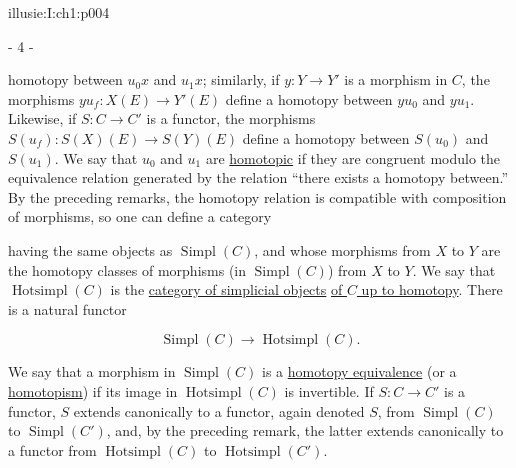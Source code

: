 \IllusieSetPhysicalPageSize{447bp}{698.6bp}
\begin{illusiebodypage}{illusie:I:ch1:p004}
\begin{center}- 4 -\end{center}
\vspace{7bp}\fontsize{9}{18}\selectfont

\hypertarget{illusie:I:ch1:s1:1:p9c1}{}%
\noindent homotopy between $u_0x$ and $u_1x$; similarly, if
$y:Y\longrightarrow Y'$ is a morphism in $C$, the morphisms
$yu_f:X(E)\longrightarrow Y'(E)$ define a homotopy between $yu_0$ and $yu_1$.
Likewise, if $S:C\longrightarrow C'$ is a functor, the morphisms
$S(u_f):S(X)(E)\longrightarrow S(Y)(E)$ define a homotopy between $S(u_0)$ and
$S(u_1)$. We say that $u_0$ and $u_1$ are \underline{homotopic} if they are
congruent modulo the equivalence relation generated by the relation “there
exists a homotopy between.” By the preceding remarks, the homotopy relation is
compatible with composition of morphisms, so one can define a category

\hypertarget{illusie:I:ch1:s1:1:eq5}{}%
\noindent{}\par

\hypertarget{illusie:I:ch1:s1:1:p10}{}%
having the same objects as $\operatorname{Simpl}(C)$, and whose morphisms from
$X$ to $Y$ are the homotopy classes of morphisms (in
$\operatorname{Simpl}(C)$) from $X$ to $Y$. We say that
$\operatorname{Hotsimpl}(C)$ is the \underline{category of simplicial objects}
\underline{of $C$ up to homotopy}. There is a natural functor

\hypertarget{illusie:I:ch1:s1:1:d7}{}%
\[
  \operatorname{Simpl}(C)\longrightarrow\operatorname{Hotsimpl}(C).
\]

\hypertarget{illusie:I:ch1:s1:1:p11}{}%
We say that a morphism in $\operatorname{Simpl}(C)$ is a
\underline{homotopy equivalence} (or a \underline{homotopism}) if its image in
$\operatorname{Hotsimpl}(C)$ is invertible. If $S:C\longrightarrow C'$ is a
functor, $S$ extends canonically to a functor, again denoted $S$, from
$\operatorname{Simpl}(C)$ to $\operatorname{Simpl}(C')$, and, by the preceding
remark, the latter extends canonically to a functor from
$\operatorname{Hotsimpl}(C)$ to $\operatorname{Hotsimpl}(C')$.


\end{illusiebodypage}

